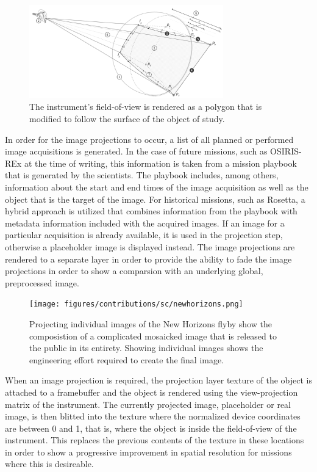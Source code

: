 \begin{figure}
\centering
\includegraphics[width=0.75\textwidth]{figures/contributions/sc/intercept.png}
\caption{The instrument's field-of-view is rendered as a polygon that is modified to follow the surface of the object of study.}
\label{contributions:astro:sc:intercept}
\end{figure}

In order for the image projections to occur, a list of all planned or performed image acquisitions is generated.  In the case of future missions, such as OSIRIS-REx at the time of writing, this information is taken from a mission playbook that is generated by the scientists.  The playbook includes, among others, information about the start and end times of the image acquisition as well as the object that is the target of the image.  For historical missions, such as Rosetta, a hybrid approach is utilized that combines information from the playbook with metadata information included with the acquired images.  If an image for a particular acquisition is already available, it is used in the projection step, otherwise a placeholder image is displayed instead.  The image projections are rendered to a separate layer in order to provide the ability to fade the image projections in order to show a comparsion with an underlying global, preprocessed image.

\begin{figure}
\centering
\texttt{[image: figures/contributions/sc/newhorizons.png]}
\caption{Projecting individual images of the New Horizons flyby show the composistion of a complicated mosaicked image that is released to the public in its entirety.  Showing individual images shows the engineering effort required to create the final image.}
\label{contributions:astro:sc:newhorizons}
\end{figure}

When an image projection is required, the projection layer texture of the object is attached to a framebuffer and the object is rendered using the view-projection matrix of the instrument.  The currently projected image, placeholder or real image, is then blitted into the texture where the normalized device coordinates are between 0 and 1, that is, where the object is inside the field-of-view of the instrument.  This replaces the previous contents of the texture in these locations in order to show a progressive improvement in spatial resolution for missions where this is desireable.

